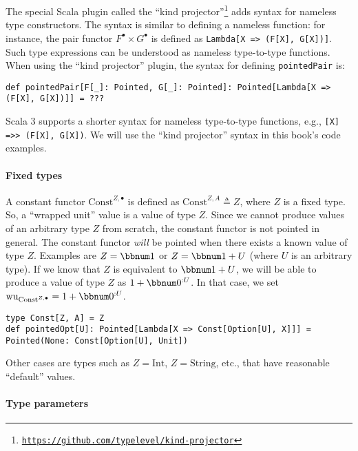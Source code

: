 The special Scala plugin called the \textsf{``}kind
projector\textsf{''}\footnote{\texttt{\href{https://github.com/typelevel/kind-projector}{https://github.com/typelevel/kind-projector}}}
adds syntax for nameless type constructors. The syntax is similar
to defining a nameless function: for instance, the pair functor $F^{\bullet}\times G^{\bullet}$
is defined as \lstinline!Lambda[X => (F[X], G[X])]!. Such type expressions
can be understood as nameless
type-to-type functions. When using the \textsf{``}kind projector\textsf{''} plugin,
the syntax for defining \lstinline!pointedPair! is:
\begin{lstlisting}
def pointedPair[F[_]: Pointed, G[_]: Pointed]: Pointed[Lambda[X => (F[X], G[X])]] = ???
\end{lstlisting}
Scala 3 supports a shorter syntax for nameless type-to-type functions,
e.g., \lstinline![X] =>> (F[X], G[X])!. We will use the \textsf{``}kind projector\textsf{''}
syntax in this book\textsf{'}s code examples.

\paragraph{Fixed types}

A constant functor $\text{Const}^{Z,\bullet}$ is defined as $\text{Const}^{Z,A}\triangleq Z$,
where $Z$ is a fixed type. So, a \textsf{``}wrapped unit\textsf{''} value is a value
of type $Z$. Since we cannot produce values of an arbitrary type
$Z$ from scratch, the constant functor is not pointed in general.
The constant functor \emph{will} be pointed when there exists a known
value of type $Z$. Examples are $Z=\bbnum 1$ or $Z=\bbnum 1+U$
(where $U$ is an arbitrary type). If we know that $Z$ is equivalent
to $\bbnum 1+U$, we will be able to produce a value of type $Z$
as $1+\bbnum 0^{:U}$. In that case, we set $\text{wu}_{\text{Const}^{Z,\bullet}}=1+\bbnum 0^{:U}$.
\begin{lstlisting}
type Const[Z, A] = Z
def pointedOpt[U]: Pointed[Lambda[X => Const[Option[U], X]]] = Pointed(None: Const[Option[U], Unit])
\end{lstlisting}
Other cases are types such as $Z=\text{Int}$, $Z=\text{String}$,
etc., that have reasonable \textsf{``}default\textsf{''} values.

\paragraph{Type parameters}

